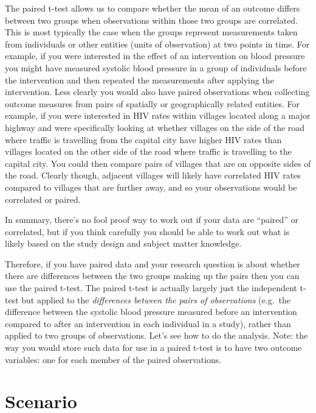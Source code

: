 \documentclass[
]{book}
\begin{document}
The paired t-test allows us to compare whether the mean of an outcome differs between two groups when observations within those two groups are correlated. This is most typically the case when the groups represent measurements taken from individuals or other entities (units of observation) at two points in time. For example, if you were interested in the effect of an intervention on blood pressure you might have measured systolic blood pressure in a group of individuals before the intervention and then repeated the measurements after applying the intervention. Less clearly you would also have paired observations when collecting outcome measures from pairs of spatially or geographically related entities. For example, if you were interested in HIV rates within villages located along a major highway and were specifically looking at whether villages on the side of the road where traffic is travelling from the capital city have higher HIV rates than villages located on the other side of the road where traffic is travelling to the capital city. You could then compare pairs of villages that are on opposite sides of the road. Clearly though, adjacent villages will likely have correlated HIV rates compared to villages that are further away, and so your observations would be correlated or paired.

In summary, there's no fool proof way to work out if your data are ``paired'' or correlated, but if you think carefully you should be able to work out what is likely based on the study design and subject matter knowledge.

Therefore, if you have paired data and your research question is about whether there are differences between the two groups making up the pairs then you can use the paired t-test. The paired t-test is actually largely just the independent t-test but applied to the \emph{differences between the pairs of observations} (e.g.~the difference between the systolic blood pressure measured before an intervention compared to after an intervention in each individual in a study), rather than applied to two groups of observations. Let's see how to do the analysis. Note: the way you would store such data for use in a paired t-test is to have two outcome variables: one for each member of the paired observations.

\hypertarget{scenario-9}{%
\section{Scenario}\label{scenario-9}}
\end{document}

